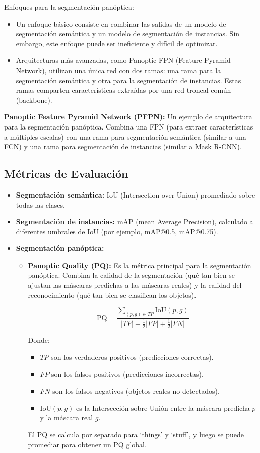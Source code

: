 \documentclass{article}
\begin{document}
Enfoques para la segmentación panóptica:

\begin{itemize}
    \item Un enfoque básico consiste en combinar las salidas de un modelo de segmentación semántica y un modelo de segmentación de instancias. Sin embargo, este enfoque puede ser ineficiente y difícil de optimizar.
    \item  Arquitecturas más avanzadas, como Panoptic FPN (Feature Pyramid Network), utilizan una única red con dos ramas: una rama para la segmentación semántica y otra para la segmentación de instancias. Estas ramas comparten características extraídas por una red troncal común (backbone).
\end{itemize}

\textbf{Panoptic Feature Pyramid Network (PFPN):} Un ejemplo de arquitectura para la segmentación panóptica. Combina una FPN (para extraer características a múltiples escalas) con una rama para segmentación semántica (similar a una FCN) y una rama para segmentación de instancias (similar a Mask R-CNN).

\subsection{Métricas de Evaluación}

\begin{itemize}
    \item \textbf{Segmentación semántica:}  IoU (Intersection over Union) promediado sobre todas las clases.
    \item \textbf{Segmentación de instancias:}  mAP (mean Average Precision), calculado a diferentes umbrales de IoU (por ejemplo, mAP@0.5, mAP@0.75).
    \item \textbf{Segmentación panóptica:}
    \begin{itemize}
    \item \textbf{Panoptic Quality (PQ):}  Es la métrica principal para la segmentación panóptica.  Combina la calidad de la segmentación (qué tan bien se ajustan las máscaras predichas a las máscaras reales) y la calidad del reconocimiento (qué tan bien se clasifican los objetos).

      \[
          \text{PQ} = \frac{\sum_{(p,g) \in TP} \text{IoU}(p, g)}{|TP| + \frac{1}{2}|FP| + \frac{1}{2}|FN|}
      \]

        Donde:
        \begin{itemize}
            \item \(TP\) son los verdaderos positivos (predicciones correctas).
            \item \(FP\) son los falsos positivos (predicciones incorrectas).
            \item \(FN\) son los falsos negativos (objetos reales no detectados).
            \item \(\text{IoU}(p, g)\) es la Intersección sobre Unión entre la máscara predicha \(p\) y la máscara real \(g\).
         \end{itemize}
          El PQ se calcula por separado para `things' y `stuff', y luego se puede promediar para obtener un PQ global.
    \end{itemize}
\end{itemize}
\end{document}
